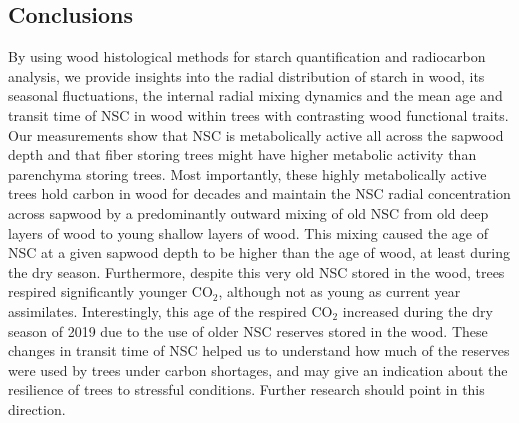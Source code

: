 \documentclass{article}
\begin{document}
\subsection{Conclusions}

By using wood histological methods for starch quantification and radiocarbon analysis, we provide insights into the radial distribution of starch in wood, its seasonal fluctuations, the internal radial mixing dynamics and the mean age and transit time of NSC in wood within trees with contrasting wood functional traits. Our measurements show that NSC is metabolically active all across the sapwood depth and that fiber storing trees might have higher metabolic activity than parenchyma storing trees. Most importantly, these highly metabolically active trees hold carbon in wood for decades and maintain the NSC radial concentration across sapwood by a predominantly outward mixing of old NSC from old deep layers of wood to young shallow layers of wood. This mixing caused the age of NSC at a given sapwood depth to be higher than the age of wood, at least during the dry season. Furthermore, despite this very old NSC stored in the wood, trees respired significantly younger CO$_{2}$, although not as young as current year assimilates. Interestingly, this age of the respired CO$_{2}$ increased during the dry season of 2019 due to the use of older NSC reserves stored in the wood. These changes in transit time of NSC helped us to understand how much of the reserves were used by trees under carbon shortages, and may give an indication about the resilience of trees to stressful conditions. Further research should point in this direction.


 



 
\end{document}
